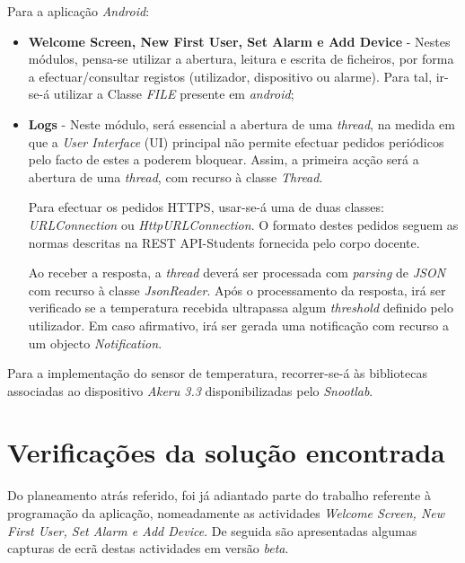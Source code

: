 \documentclass[a4paper]{article}
\begin{document}
Para a aplicação \textit{Android}:
\begin{itemize}
\item \textbf{Welcome Screen, New First User, Set Alarm e Add Device} - Nestes módulos, pensa-se utilizar a abertura, leitura e escrita de ficheiros, por forma a efectuar/consultar registos (utilizador, dispositivo ou alarme). Para tal, ir-se-á utilizar a Classe \textit{FILE} presente em \textit{android};

\item \textbf{Logs} - Neste módulo, será essencial a abertura de uma \textit{thread}, na medida em que a \textit{User Interface} (UI) principal não permite efectuar pedidos periódicos pelo facto de estes a poderem bloquear. Assim, a primeira acção será a abertura de uma \textit{thread}, com recurso à classe \textit{Thread}. 

Para efectuar os pedidos HTTPS, usar-se-á uma de duas classes: \textit{URLConnection} ou \textit{HttpURLConnection}. O formato destes pedidos seguem as normas descritas na REST API-Students fornecida pelo corpo docente.

Ao receber a resposta, a \textit{thread} deverá ser processada com \textit{parsing} de \textit{JSON} com recurso à classe \textit{JsonReader}. Após o processamento da resposta, irá ser verificado se a temperatura recebida ultrapassa algum \textit{threshold} definido pelo utilizador. Em caso afirmativo, irá ser gerada uma notificação com recurso a um objecto \textit{Notification}.
\end{itemize}

Para a implementação do sensor de temperatura, recorrer-se-á às bibliotecas associadas ao dispositivo \textit{Akeru 3.3} disponibilizadas pelo \textit{Snootlab}.

\section{Verificações da solução encontrada}

Do planeamento atrás referido, foi já adiantado parte do trabalho referente à programação da aplicação, nomeadamente as actividades \textit{Welcome Screen, New First User, Set Alarm e Add Device}. De seguida são apresentadas algumas capturas de ecrã destas actividades em versão \textit{beta}.
\end{document}
